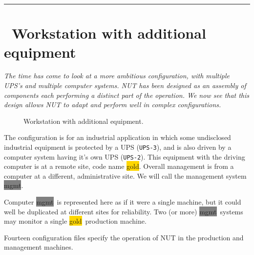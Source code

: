 \documentclass[12pt]{article}
\newlength{\headersep}\setlength{\headersep}{3mm}
\newcommand{\Hsep}{\hspace{\headersep}}
\newcommand{\newcolumn}{\vfill\eject}
\newcommand{\gold}[1][gold]{\colorbox{GOLD}{#1}}
\newcommand{\mgmt}[1][mgmt]{\colorbox{GRAY}{#1}}
\begin{document}
\vspace*{\fill}
\begin{center}\rule{\LinePrinterwidth}{0.5mm}\end{center}
\vspace*{\fill}

\begin{center}
\end{center}

\vspace*{\fill}


\newcolumn
\section{\Hsep\ Workstation with additional equipment}\label{section:big}

\textsl{The time has come to look at a more ambitious configuration, with
  multiple UPS's and multiple computer systems.  NUT has been designed as an
  assembly of components each performing a distinct part of the operation.  We
  now see that this design allows NUT to adapt and perform well in complex
  configurations.}

\begin{figure}[ht]
\vspace{-9mm}
\begin{center}
\end{center}
\vspace{-6mm}
\caption{Workstation with additional equipment.\label{fig:big}}
\end{figure}

The configuration is for an industrial application in which some
undisclosed industrial equipment is protected by a UPS
(\texttt{UPS-3}), and is also driven by a computer system having it's
own UPS (\texttt{UPS-2}).  This equipment with the driving computer is
at a remote site, code name \gold.  Overall management is from a
computer at a different, administrative site.  We will call the
management system \mgmt.

Computer \mgmt\ is represented here as if it were a single machine, but it
could well be duplicated at different sites for reliability.  Two (or more)
\mgmt\ systems may monitor a single \gold\ production machine.

Fourteen configuration files specify the operation of NUT in the production and
management machines.  
\end{document}
